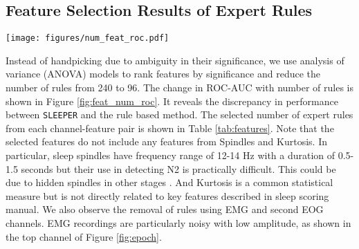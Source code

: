 \documentclass[pmlr]{jmlr}
\newcommand{\mname}
{\texttt{SLEEPER}\xspace}
\begin{document}
\subsection{Feature Selection Results of Expert Rules}\label{sec:dim_reduce}

\begin{figure*}
    \centering
    \texttt{[image: figures/num\_feat\_roc.pdf]}
    \caption{\mname ROC-AUC vs Number of Rules}
    \label{fig:feat_num_roc}
\end{figure*}



\begin{table}
  \begin{minipage}{\textwidth}
    \caption[LOF]{96 selected rules out of 240 expert rules using ISRUC dataset\footnote{96 selected rules for MGH Dataset is shown in Table \ref{tab:features_mgh} in Supplemental material.}} \label{tab:features}
\end{minipage}
\end{table}
Instead of handpicking due to ambiguity in their significance, we use analysis of variance (ANOVA) models to rank features by significance and reduce the number of rules from 240 to 96. The change in ROC-AUC with number of rules is shown in Figure \ref{fig:feat_num_roc}. It reveals the discrepancy in performance between \mname and the rule based method. The selected number of expert rules from each channel-feature pair is shown in Table \ref{tab:features}.
Note that the selected features do not include any features from Spindles and Kurtosis. In particular, sleep spindles have frequency range of 12-14 Hz with a duration of 0.5-1.5 seconds but their use in detecting N2 is practically difficult. This could be due to hidden spindles in other stages \citep{spindle_algo}. And Kurtosis is a common statistical measure but is not directly related to key features described in sleep scoring manual. We also observe the removal of rules using EMG and second EOG channels. EMG recordings are particularly noisy with low amplitude, as shown in the top channel of Figure \ref{fig:epoch}. 
\end{document}
